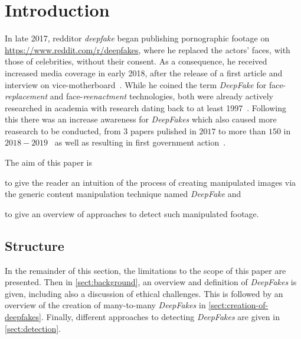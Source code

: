 \section{Introduction}
In late 2017, \gls{redditor} \textit{deepfake} began publishing pornographic footage
on \url{https://www.reddit.com/r/deepfakes}, where he replaced the actors' faces,
with those of celebrities, without their consent. As a consequence, he
received increased media coverage in early 2018, after the release of a first 
article and interview on vice-motherboard~\cite{Cole.2017}. While he coined the
term \textit{DeepFake} for face-\textit{replacement} and face-\textit{reenactment}
technologies, both were already actively researched in academia with research 
dating back to at least 1997~\cite{Bregler.1997}.
Following this there was an increase awareness for \textit{DeepFakes} which also
caused more reasearch to be conducted, from \(3\) papers pulished in \(2017\) to
more than \(150\) in \(2018-2019\)~\cite{mirsky_creation_2020} as well as
resulting in first government action~\cite{senate_-_homeland_security_and_governmental_affairs_deepfake_2019}.

\par
The aim of this paper is
\begin{enumerate*}[a.)]
    \item to give the reader an intuition of the process of creating manipulated
    images via the generic content manipulation technique named \textit{DeepFake}
    and
    \item to give an overview of approaches to detect such manipulated footage.
\end{enumerate*}

\subsection{Structure}
In the remainder of this section, the limitations to the scope of this paper are
presented. Then in \cref{sect:background}, an overview and definition of \textit{DeepFakes}
is given, including also a discussion of ethical challenges.
This is followed by an overview of the creation of many-to-many \textit{DeepFakes}
in \cref{sect:creation-of-deepfakes}. Finally, different approaches to detecting
\textit{DeepFakes} are given in \cref{sect:detection}.

